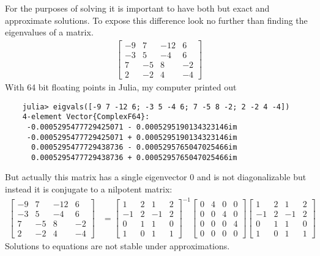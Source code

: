 For the purposes of solving it is important to have both 
but exact and approximate solutions.
To expose this difference 
look no further than finding the eigenvalues of a matrix.
\begin{align*}
    \begin{bmatrix}
        -9 & 7 & -12 & 6\\
        -3 & 5 & -4 & 6\\
        7 & -5 & 8 & -2\\
        2 & -2 & 4 & -4
    \end{bmatrix}
\end{align*}
With 64 bit floating points in Julia, my computer printed out 
\begin{lstlisting}
    julia> eigvals([-9 7 -12 6; -3 5 -4 6; 7 -5 8 -2; 2 -2 4 -4])
    4-element Vector{ComplexF64}:
     -0.0005295477729425071 - 0.0005295190134323146im
     -0.0005295477729425071 + 0.0005295190134323146im
      0.0005295477729438736 - 0.0005295765047025466im
      0.0005295477729438736 + 0.0005295765047025466im   
\end{lstlisting}
But actually this matrix has a single eigenvector $0$ and is not diagonalizable 
but instead it is conjugate to a nilpotent matrix:
\begin{align*}
    \begin{bmatrix}
        -9 & 7 & -12 & 6\\
        -3 & 5 & -4 & 6\\
        7 & -5 & 8 & -2\\
        2 & -2 & 4 & -4
    \end{bmatrix}
    & =
    \begin{bmatrix}
        1 & 2 &  1 & 2\\
       -1 & 2 & -1 & 2\\
         0 & 1 &  1 & 0\\
         1 & 0 &  1 &  1
   \end{bmatrix}^{-1}
   \begin{bmatrix}
        0 & 4 & 0 & 0\\
        0 & 0 & 4 & 0\\
        0 & 0 & 0 & 4\\
        0 & 0 & 0 & 0
    \end{bmatrix}
    \begin{bmatrix}
         1 & 2 &  1 & 2\\
        -1 & 2 & -1 & 2\\
          0 & 1 &  1 & 0\\
          1 & 0 &  1 &  1
    \end{bmatrix}
\end{align*}
Solutions to equations are not stable under approximations.




